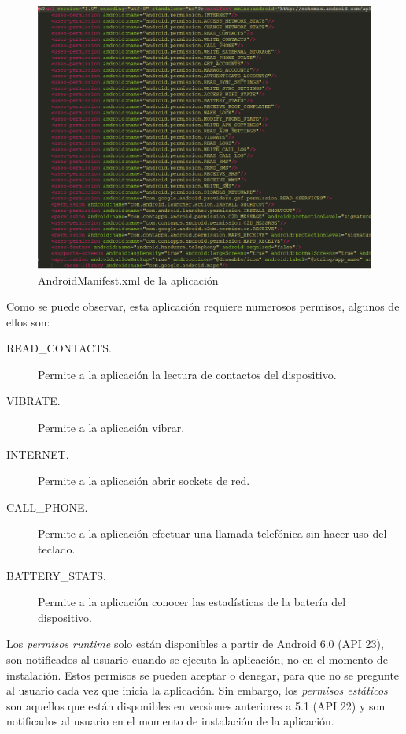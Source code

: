 \documentclass[a4paper,11pt,oneside]{book}
\begin{document}
\begin{enumerate}
\begin{figure}[h]
\centering
\includegraphics[width=\textwidth]{Punto44}
\caption{AndroidManifest.xml de la aplicación}
\label{Punto44}
\end{figure}

\end{enumerate}

Como se puede observar, esta aplicación requiere numerosos permisos, algunos de ellos son:

\begin{description}
\item[READ\_{}CONTACTS.] Permite a la aplicación la lectura de contactos del dispositivo.
\item[VIBRATE.] Permite a la aplicación vibrar.
\item[INTERNET.] Permite a la aplicación abrir sockets de red.
\item[CALL\_{}PHONE.] Permite a la aplicación efectuar una llamada telefónica sin hacer uso del teclado.
\item[BATTERY\_{}STATS.] Permite a la aplicación conocer las estadísticas de la batería del dispositivo.
\end{description}

Los \emph{permisos runtime} solo están disponibles a partir de Android 6.0 (API 23), son notificados al usuario cuando se ejecuta la aplicación, no en el momento de instalación. Estos permisos se pueden aceptar o denegar, para que no se pregunte al usuario cada vez que inicia la aplicación. Sin embargo, los \emph{permisos estáticos} son aquellos que están disponibles en versiones anteriores a 5.1 (API 22) y son notificados al usuario en el momento de instalación de la aplicación.
\end{document}
